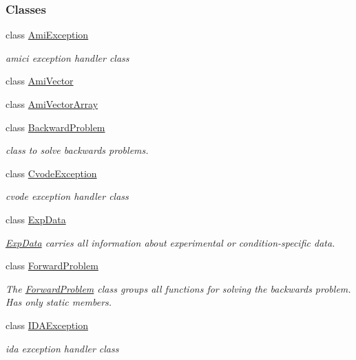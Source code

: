 \subsubsection*{Classes}
\begin{DoxyCompactItemize}
\item 
class \mbox{\hyperlink{classamici_1_1_ami_exception}{Ami\+Exception}}
\begin{DoxyCompactList}\small\item\em amici exception handler class \end{DoxyCompactList}\item 
class \mbox{\hyperlink{classamici_1_1_ami_vector}{Ami\+Vector}}
\item 
class \mbox{\hyperlink{classamici_1_1_ami_vector_array}{Ami\+Vector\+Array}}
\item 
class \mbox{\hyperlink{classamici_1_1_backward_problem}{Backward\+Problem}}
\begin{DoxyCompactList}\small\item\em class to solve backwards problems. \end{DoxyCompactList}\item 
class \mbox{\hyperlink{classamici_1_1_cvode_exception}{Cvode\+Exception}}
\begin{DoxyCompactList}\small\item\em cvode exception handler class \end{DoxyCompactList}\item 
class \mbox{\hyperlink{classamici_1_1_exp_data}{Exp\+Data}}
\begin{DoxyCompactList}\small\item\em \mbox{\hyperlink{classamici_1_1_exp_data}{Exp\+Data}} carries all information about experimental or condition-\/specific data. \end{DoxyCompactList}\item 
class \mbox{\hyperlink{classamici_1_1_forward_problem}{Forward\+Problem}}
\begin{DoxyCompactList}\small\item\em The \mbox{\hyperlink{classamici_1_1_forward_problem}{Forward\+Problem}} class groups all functions for solving the backwards problem. Has only static members. \end{DoxyCompactList}\item 
class \mbox{\hyperlink{classamici_1_1_i_d_a_exception}{I\+D\+A\+Exception}}
\begin{DoxyCompactList}\small\item\em ida exception handler class \end{DoxyCompactList}\item 

\end{DoxyCompactItemize}
